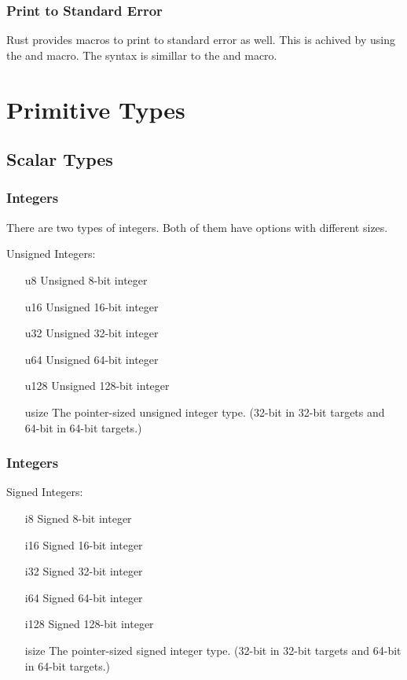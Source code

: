 \documentclass{beamer}
\begin{document}
\begin{frame}
  \frametitle{Print to Standard Error}
  Rust provides macros to print to standard error as well. This is achived by using the  and  macro. The syntax is simillar to the  and  macro.
  
\end{frame}

\section{Primitive Types}
\subsection{Scalar Types}
\begin{frame}
  \frametitle{Integers}
  There are two types of integers. Both of them have options with different sizes.

  Unsigned Integers:
  \begin{itemize}
    \item[u8]{Unsigned 8-bit integer}
    \item[u16]{Unsigned 16-bit integer}
    \item[u32]{Unsigned 32-bit integer}
    \item[u64]{Unsigned 64-bit integer}
    \item[u128]{Unsigned 128-bit integer}
    \item[usize]{The pointer-sized unsigned integer type. (32-bit in 32-bit targets and 64-bit in 64-bit targets.)}
  \end{itemize}
\end{frame}

\begin{frame}
  \frametitle{Integers}
  Signed Integers:
  \begin{itemize}
    \item[i8]{Signed 8-bit integer}
    \item[i16]{Signed 16-bit integer}
    \item[i32]{Signed 32-bit integer}
    \item[i64]{Signed 64-bit integer}
    \item[i128]{Signed 128-bit integer}
    \item[isize]{The pointer-sized signed integer type. (32-bit in 32-bit targets and 64-bit in 64-bit targets.)}
  \end{itemize}
\end{frame}
\end{document}
